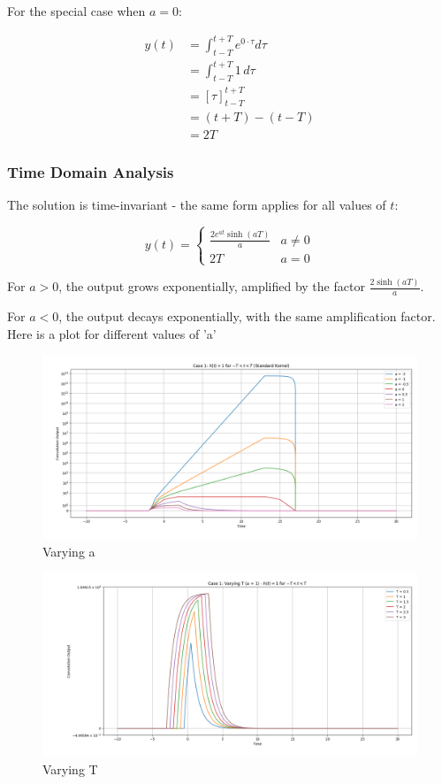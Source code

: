 For the special case when $a = 0$:

\begin{align}
y(t) &= \int_{t-T}^{t+T} e^{0\cdot\tau}d\tau \\
&= \int_{t-T}^{t+T} 1 \, d\tau \\
&= [{\tau}]_{t-T}^{t+T} \\
&= (t+T) - (t-T) \\
&= 2T
\end{align}

\subsubsection{Time Domain Analysis}
The solution is time-invariant - the same form applies for all values of $t$:

\begin{equation}
y(t) = 
\begin{cases}
\frac{2e^{at}\sinh(aT)}{a} & a \neq 0 \\
2T & a = 0
\end{cases}
\end{equation}

For $a > 0$, the output grows exponentially, amplified by the factor $\frac{2\sinh(aT)}{a}$.

For $a < 0$, the output decays exponentially, with the same amplification factor. Here is a plot for different values of 'a'
\begin{figure}[H]
    \centering
    \includegraphics[width=0.8\linewidth]{codes/codes_exp/plotseax/standardkernelvaryinga.png}
    \caption{Varying a}
    \label{fig:enter-label}
\end{figure}
\begin{figure}[H]
    \centering
    \includegraphics[width=0.8\linewidth]{codes/codes_exp/plotseax/standardkernelcaryingT.png}
    \caption{Varying T}
    \label{fig:enter-label}
\end{figure}

